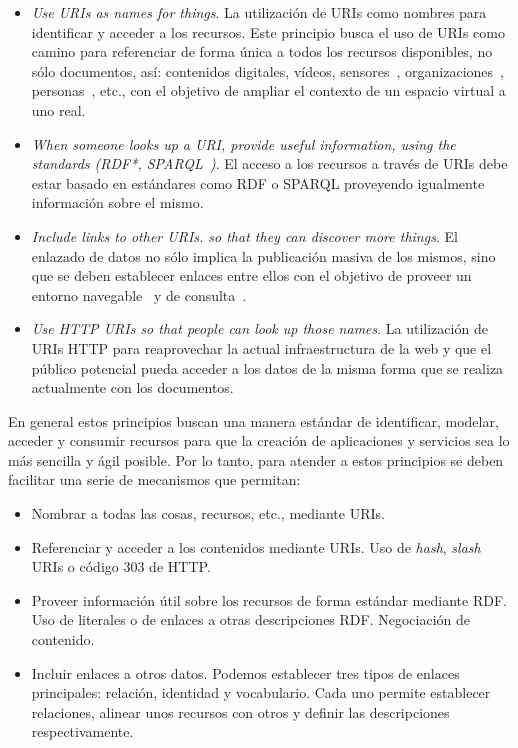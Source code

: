 \begin{itemize}
 \item \textit{Use \gls{URI}s as names for things}. La utilización de URIs como nombres para identificar y acceder a los recursos. Este principio busca el uso de URIs como camino para referenciar de forma única a todos
los recursos disponibles, no sólo documentos, así: contenidos digitales, vídeos, sensores~\cite{ontology-search,Jeung:2010:EMM:1850003.1850235}, 
  organizaciones~\cite{open-corporates}, personas~\cite{facebook-ld}, etc., con el objetivo de ampliar el contexto de un espacio virtual a uno real.
 \item \textit{When someone looks up a URI, provide useful information, using the standards (RDF*, SPARQL~\cite{Sparql})}. El acceso 
a los recursos a través de URIs debe estar basado en estándares como \gls{RDF} o \gls{SPARQL} proveyendo igualmente información
sobre el mismo.
\item \textit{Include links to other URIs. so that they can discover more things}. El enlazado de datos no sólo implica la publicación
masiva de los mismos, sino que se deben establecer enlaces entre ellos con el objetivo de proveer un entorno 
navegable~\cite{Berners-lee06tabulator:exploring,Pietriga06fresnel} y de consulta~\cite{Hartig09executingsparql}.
\item \textit{Use \gls{HTTP URI}s so that people can look up those names}. La utilización de URIs HTTP para reaprovechar la actual infraestructura
de la web y que el público potencial pueda acceder a los datos de la misma forma que se realiza actualmente con los documentos.
\end{itemize}

En general estos principios buscan una manera estándar de identificar, modelar, acceder y consumir recursos para que la creación
de aplicaciones y servicios sea lo más sencilla y ágil posible. Por lo tanto, 
para atender a estos principios se deben facilitar una serie de mecanismos que permitan:
\begin{itemize}
 \item Nombrar a todas las cosas, recursos, etc., mediante URIs.
 \item Referenciar y acceder a los contenidos mediante URIs. Uso de \textit{hash}, \textit{slash} URIs o código $303$ de \gls{HTTP}. 
 \item Proveer información útil sobre los recursos de forma estándar mediante RDF. Uso de literales o de enlaces a otras
descripciones RDF. Negociación de contenido.
 \item Incluir enlaces a otros datos. Podemos establecer tres tipos de enlaces principales: relación, identidad y 
vocabulario. Cada uno permite establecer relaciones, alinear unos recursos con otros y definir las descripciones
respectivamente.
\end{itemize}

